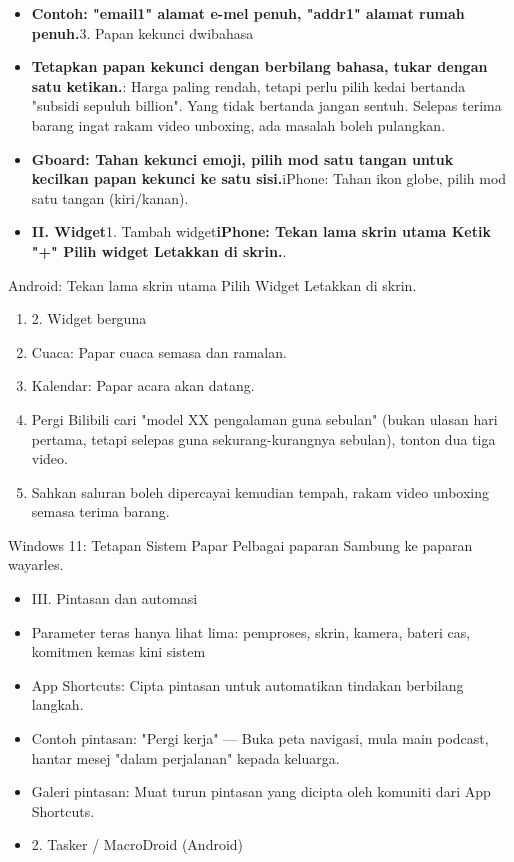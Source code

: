 \begin{itemize}
  \item \textbf{Contoh: "email1" alamat e-mel penuh, "addr1" alamat rumah penuh.}3. Papan kekunci dwibahasa
  \item \textbf{Tetapkan papan kekunci dengan berbilang bahasa, tukar dengan satu ketikan.}: Harga paling rendah, tetapi perlu pilih kedai bertanda "subsidi sepuluh billion". Yang tidak bertanda jangan sentuh. Selepas terima barang ingat rakam video unboxing, ada masalah boleh pulangkan.
  \item \textbf{Gboard: Tahan kekunci emoji, pilih mod satu tangan untuk kecilkan papan kekunci ke satu sisi.}iPhone: Tahan ikon globe, pilih mod satu tangan (kiri/kanan).
  \item \textbf{II. Widget}1. Tambah widget\textbf{iPhone: Tekan lama skrin utama Ketik "+" Pilih widget Letakkan di skrin.}.
\end{itemize}

\begin{tcbpractice}{Android: Tekan lama skrin utama Pilih Widget Letakkan di skrin.}
\begin{enumerate}
  \item 2. Widget berguna
  \item Cuaca: Papar cuaca semasa dan ramalan.
  \item Kalendar: Papar acara akan datang.
  \item Pergi Bilibili cari "model XX pengalaman guna sebulan" (bukan ulasan hari pertama, tetapi selepas guna sekurang-kurangnya sebulan), tonton dua tiga video.
  \item Sahkan saluran boleh dipercayai kemudian tempah, rakam video unboxing semasa terima barang.
\end{enumerate}

\end{tcbpractice}

\begin{tcbsummary}{Windows 11: Tetapan Sistem Papar Pelbagai paparan Sambung ke paparan wayarles.}
\begin{itemize}
  \item III. Pintasan dan automasi
  \item Parameter teras hanya lihat lima: pemproses, skrin, kamera, bateri cas, komitmen kemas kini sistem
  \item App Shortcuts: Cipta pintasan untuk automatikan tindakan berbilang langkah.
  \item Contoh pintasan: "Pergi kerja" — Buka peta navigasi, mula main podcast, hantar mesej "dalam perjalanan" kepada keluarga.
  \item Galeri pintasan: Muat turun pintasan yang dicipta oleh komuniti dari App Shortcuts.
  \item 2. Tasker / MacroDroid (Android)
\end{itemize}

\end{tcbsummary}
